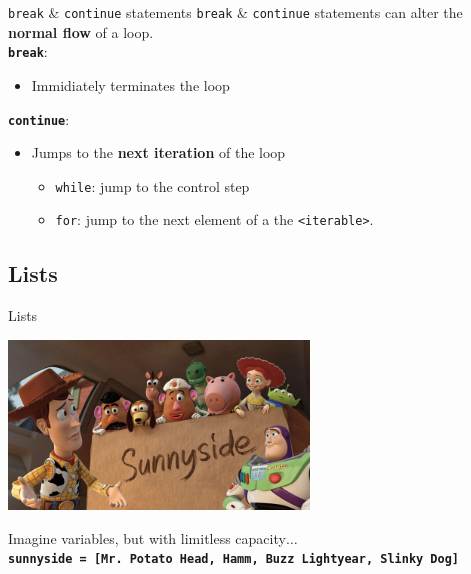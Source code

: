     \begin{frame}{\texttt{break} \& \texttt{continue} statements}
        \Large
        \texttt{break} \& \texttt{continue} statements can alter the \textbf{normal flow} of a loop.\\
        \pause
        \LARGE
        \texttt{\textbf{break}}:
        \begin{itemize}
            \pause
            \item Immidiately terminates the loop
        \end{itemize}
        \pause
        \texttt{\textbf{continue}}:
        \pause
        \begin{itemize}
            \item Jumps to the \textbf{next iteration} of the loop
            \pause
            \begin{itemize}
                \large
                \item \texttt{while}: \pause jump to the control step \pause
                \item \texttt{for}: \pause jump to the next element of a the \texttt{<iterable>}.
            \end{itemize}
        \end{itemize}
    \end{frame}

    \subsection{Lists}

        \begin{frame}{Lists}
            \begin{center}
                \includegraphics[width=0.6\textwidth]{../Lecture1/images/box_many.jpg}                
            \end{center}
            \LARGE
            Imagine variables, but with limitless capacity$\dots$\\
            \textbf{\texttt{sunnyside = [\textquotesingle Mr. Potato Head\textquotesingle, \textquotesingle Hamm\textquotesingle,
            \textquotesingle Buzz Lightyear\textquotesingle, \textquotesingle Slinky Dog\textquotesingle]}}
        \end{frame}

